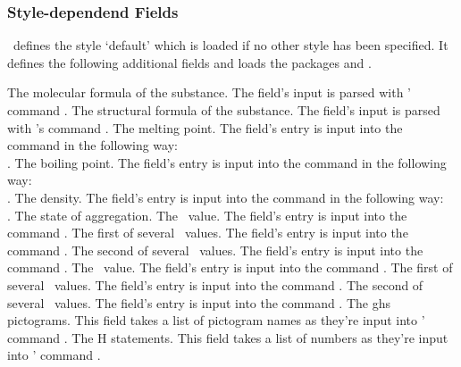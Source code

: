 \documentclass[load-preamble+]{cnltx-doc}
\begin{document}
\subsubsection{Style-dependend Fields}
\substances\ defines the style `default' which is loaded if no other style has
been specified. It defines the following additional fields and loads the
packages  and .
\begin{options}
    The molecular formula of the substance. The field's input is parsed with
    ' command .
    The structural formula of the substance. The field's input is parsed with
    's command .
    The melting point. The field's entry is input into the 
    command  in the following way: \\
    .
    The boiling point. The field's entry is input into the 
    command  in the following way: \\
    .
    The density. The field's entry is input into the  command
     in the following way: \\
    .
    The state of aggregation.
    The \pKa\ value. The field's entry is input into the  command
    .
    The first of several \pKa\ values. The field's entry is input into the
     command .
    The second of several \pKa\ values. The field's entry is input into the
     command .
    The \pKb\ value. The field's entry is input into the  command
    .
    The first of several \pKb\ values. The field's entry is input into the
     command .
    The second of several \pKb\ values. The field's entry is input into the
     command .
    The \acs{ghs} pictograms. This field takes a list of pictogram names as
    they're input into ' command .
    The H statements. This field takes a list of numbers as they're input into
    ' command .

\end{options}
\end{document}
